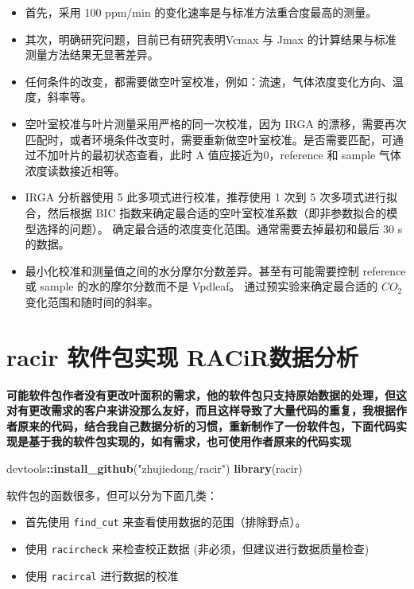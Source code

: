 \documentclass[
]{krantz}
\makeatletter
\newenvironment{Shaded}{\begin{snugshade}}{\end{snugshade}}
\newcommand{\KeywordTok}[1]{\textcolor[rgb]{0.13,0.29,0.53}{\textbf{#1}}}
\newcommand{\NormalTok}[1]{#1}
\newcommand{\OperatorTok}[1]{\textcolor[rgb]{0.81,0.36,0.00}{\textbf{#1}}}
\newcommand{\StringTok}[1]{\textcolor[rgb]{0.31,0.60,0.02}{#1}}
\providecommand{\tightlist}{%
  \setlength{\itemsep}{0pt}\setlength{\parskip}{0pt}}
\newenvironment{kframe}{%
\medskip{}
\setlength{\fboxsep}{.8em}
 \def\at@end@of@kframe{}%
 \ifinner\ifhmode%
  \def\at@end@of@kframe{\end{minipage}}%
  \begin{minipage}{\columnwidth}%
 \fi\fi%
 \def\FrameCommand##1{\hskip\@totalleftmargin \hskip-\fboxsep
 \colorbox{shadecolor}{##1}\hskip-\fboxsep
     \hskip-\linewidth \hskip-\@totalleftmargin \hskip\columnwidth}%
 \MakeFramed {\advance\hsize-\width
   \@totalleftmargin\z@ \linewidth\hsize
   \@setminipage}}%
 {\par\unskip\endMakeFramed%
 \at@end@of@kframe}
\renewenvironment{Shaded}{\begin{kframe}}{\end{kframe}}
\makeatother
\begin{document}
\begin{itemize}
\tightlist
\item
  首先，采用 100 ppm/min 的变化速率是与标准方法重合度最高的测量。
\item
  其次，明确研究问题，目前已有研究表明Vcmax 与 Jmax 的计算结果与标准测量方法结果无显著差异。
\item
  任何条件的改变，都需要做空叶室校准，例如：流速，气体浓度变化方向、温度，斜率等。
\item
  空叶室校准与叶片测量采用严格的同一次校准，因为 IRGA 的漂移，需要再次匹配时，或者环境条件改变时，需要重新做空叶室校准。是否需要匹配，可通过不加叶片的最初状态查看，此时 A 值应接近为0，reference 和 sample 气体浓度读数接近相等。
\item
  IRGA 分析器使用 5 此多项式进行校准，推荐使用 1 次到 5 次多项式进行拟合，然后根据 BIC 指数来确定最合适的空叶室校准系数（即非参数拟合的模型选择的问题）。
  确定最合适的浓度变化范围。通常需要去掉最初和最后 30 s的数据。
\item
  最小化校准和测量值之间的水分摩尔分数差异。甚至有可能需要控制 reference 或 sample 的水的摩尔分数而不是 Vpdleaf。
  通过预实验来确定最合适的 \(CO_2\) 变化范围和随时间的斜率。
\end{itemize}

\hypertarget{racir_pkg}{%
\section{\texorpdfstring{racir 软件包实现 RACiR\texttrademark 数据分析}{racir 软件包实现 RACiR数据分析}}\label{racir_pkg}}

\textbf{可能软件包作者没有更改叶面积的需求，他的软件包只支持原始数据的处理，但这对有更改需求的客户来讲没那么友好，而且这样导致了大量代码的重复，我根据作者原来的代码，结合我自己数据分析的习惯，重新制作了一份软件包，下面代码实现是基于我的软件包实现的，如有需求，也可使用作者原来的代码实现}

\begin{Shaded}
\begin{Highlighting}[]
\NormalTok{devtools}\OperatorTok{::}\KeywordTok{install\_github}\NormalTok{(}\StringTok{"zhujiedong/racir"}\NormalTok{)}
\KeywordTok{library}\NormalTok{(racir)}
\end{Highlighting}
\end{Shaded}

软件包的函数很多，但可以分为下面几类：

\begin{itemize}
\item
  首先使用 \texttt{find\_cut} 来查看使用数据的范围（排除野点）。
\item
  使用 \texttt{racircheck} 来检查校正数据 (非必须，但建议进行数据质量检查)
\item
  使用 \texttt{racircal} 进行数据的校准
\end{itemize}
\end{document}
